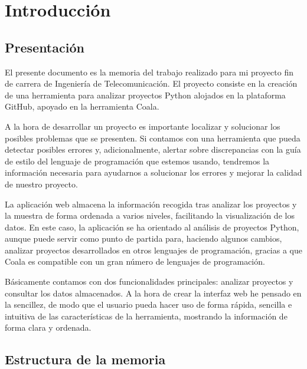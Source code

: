 \documentclass[a4paper, 12pt]{book}
\begin{document}

\cleardoublepage
\chapter{Introducción}
\label{sec:intro} %

\section{Presentación}
\label{sec:presentacion}
El presente documento es la memoria del trabajo realizado para mi proyecto fin de carrera de Ingeniería de Telecomunicación. El proyecto consiste en la creación de una herramienta para analizar proyectos Python alojados en la plataforma GitHub, apoyado en la herramienta Coala.

A la hora de desarrollar un proyecto es importante localizar y solucionar los posibles problemas que se presenten. Si contamos con una herramienta que pueda detectar posibles errores y, adicionalmente, alertar sobre discrepancias con la guía de estilo del lenguaje de programación que estemos usando, tendremos la información necesaria para ayudarnos a solucionar los errores y mejorar la calidad de nuestro proyecto.

La aplicación web almacena la información recogida tras analizar los proyectos y la muestra de forma ordenada a varios niveles, facilitando la visualización de los datos. En este caso, la aplicación se ha orientado al análisis de proyectos Python, aunque puede servir como punto de partida para, haciendo algunos cambios, analizar proyectos desarrollados en otros lenguajes de programación, gracias a que Coala es compatible con un gran número de lenguajes de programación.

Básicamente contamos con dos funcionalidades principales: analizar proyectos y consultar los datos almacenados. A la hora de crear la interfaz web he pensado en la sencillez, de modo que el usuario pueda hacer uso de forma rápida, sencilla e intuitiva de las características de la herramienta, mostrando la información de forma clara y ordenada.

\section{Estructura de la memoria}
\label{sec:estructura}
\end{document}
